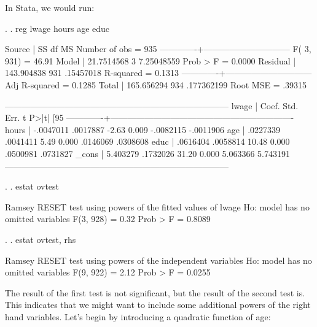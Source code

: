 \documentclass[12pt]{article}
\begin{document}
In Stata, we would run:

\begin{stlog}
  . 
. reg lwage hours age educ

      Source |       SS       df       MS              Number of obs =     935
-------------+------------------------------           F(  3,   931) =   46.91
       Model |  21.7514568     3  7.25048559           Prob > F      =  0.0000
    Residual |  143.904838   931   .15457018           R-squared     =  0.1313
-------------+------------------------------           Adj R-squared =  0.1285
       Total |  165.656294   934  .177362199           Root MSE      =  .39315

------------------------------------------------------------------------------
       lwage |      Coef.   Std. Err.      t    P>|t|     [95%
-------------+----------------------------------------------------------------
       hours |  -.0047011   .0017887    -2.63   0.009    -.0082115   -.0011906
         age |   .0227339   .0041411     5.49   0.000     .0146069    .0308608
        educ |   .0616404   .0058814    10.48   0.000     .0500981    .0731827
       _cons |   5.403279   .1732026    31.20   0.000     5.063366    5.743191
------------------------------------------------------------------------------

. 
. estat ovtest

Ramsey RESET test using powers of the fitted values of lwage
       Ho:  model has no omitted variables
                 F(3, 928) =      0.32
                  Prob > F =      0.8089

. 
. estat ovtest, rhs

Ramsey RESET test using powers of the independent variables
       Ho:  model has no omitted variables
                 F(9, 922) =      2.12
                  Prob > F =      0.0255
\end{stlog}

The result of the first test is not significant, but the result of the
second test is. This indicates that we might want to include some
additional powers of the right hand variables. Let's begin by
introducing a quadratic function of age:
\end{document}
